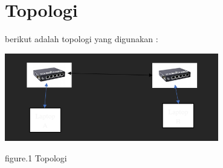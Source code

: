 \section{Topologi}

berikut adalah topologi yang digunakan :

\begin{center}
    \includegraphics[width=0.7\textwidth]{image/P2/Topologi.png}    
    
    figure.1 Topologi
\end{center}


